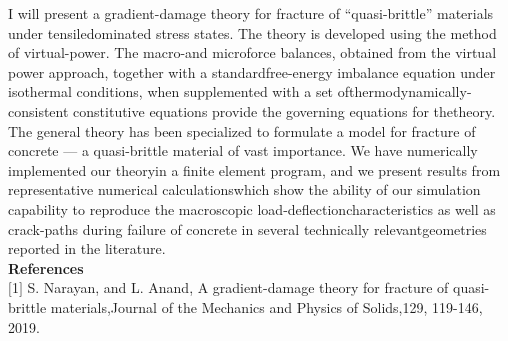 I will present a gradient-damage theory for fracture of “quasi-brittle” materials under tensiledominated stress states.  The theory is developed using the method of virtual-power.  The macro-and microforce balances, obtained from the virtual power approach, together with a standardfree-energy imbalance equation under isothermal conditions, when supplemented with a set ofthermodynamically-consistent  constitutive  equations  provide  the  governing  equations  for  thetheory.  The general theory has been specialized to formulate a model for fracture of concrete --- a quasi-brittle material of vast importance.  We have numerically implemented our theoryin a finite element program, and we present results from representative numerical calculationswhich show the ability of our simulation capability to reproduce the macroscopic load-deflectioncharacteristics as well as crack-paths during failure of concrete in several technically relevantgeometries reported in the literature.\\

\noindent\textbf{References}\\
$[$1$]$ S. Narayan, and L. Anand, A gradient-damage theory for fracture of quasi-brittle materials,Journal of the Mechanics and Physics of Solids,129, 119-146, 2019.
